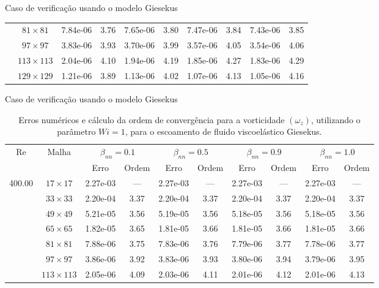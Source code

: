 \begin{frame}{Caso de verificação usando o modelo Giesekus}
\begin{table}[H]
{\begin{tabular*}{\textwidth}{@{\extracolsep\fill}cccccccccc@{}}
    & $81\times 81$ & 7.84e-06 & 3.76 & 7.65e-06 & 3.80 & 7.47e-06 & 3.84 & 7.43e-06 & 3.85 \\
    & $97\times 97$ & 3.83e-06 & 3.93 & 3.70e-06 & 3.99 & 3.57e-06 & 4.05 & 3.54e-06 & 4.06 \\
    & $113\times 113$ & 2.04e-06 & 4.10 & 1.94e-06 & 4.19 & 1.85e-06 & 4.27 & 1.83e-06 & 4.29 \\
    & $129\times 129$ & 1.21e-06 & 3.89 & 1.13e-06 & 4.02 & 1.07e-06 & 4.13 & 1.05e-06 & 4.16 \\
    \hline
    \end{tabular*}
}
\end{table}
\end{frame}

\begin{frame}{Caso de verificação usando o modelo Giesekus}
    \centering
    \begin{table}[H]
\caption{Erros numéricos e cálculo da ordem de convergência para a vorticidade $(\omega_{z})$, utilizando o parâmetro $Wi=1$, para o escoamento de fluido viscoelástico Giesekus.\label{tab_GiesekusWzResumida_2}}
\scriptsize{
    \begin{tabular*}{\textwidth}{@{\extracolsep\fill}cccccccccc@{}}
    \hline
    \multirow{2}{*}{$\operatorname{Re}$} & \multirow{2}{*}{Malha} & \multicolumn{2}{c}{$\beta_{nn}=0.1$}  & \multicolumn{2}{c}{$\beta_{nn}=0.5$}  & \multicolumn{2}{c}{$\beta_{nn}=0.9$}  & \multicolumn{2}{c}{$\beta_{nn}=1.0$}\\ %
     & & Erro & Ordem & Erro & Ordem & Erro & Ordem & Erro & Ordem \\
    \hline
    \multirow{7}{*}{400.00} & $17\times 17$ & 2.27e-03 & --- & 2.27e-03 & --- & 2.27e-03 & --- & 2.27e-03 & --- \\
    & $33\times 33$ & 2.20e-04 & 3.37 & 2.20e-04 & 3.37 & 2.20e-04 & 3.37 & 2.20e-04 & 3.37 \\
    & $49\times 49$ & 5.21e-05 & 3.56 & 5.19e-05 & 3.56 & 5.18e-05 & 3.56 & 5.18e-05 & 3.56 \\
    & $65\times 65$ & 1.82e-05 & 3.65 & 1.81e-05 & 3.66 & 1.81e-05 & 3.66 & 1.81e-05 & 3.66 \\
    & $81\times 81$ & 7.88e-06 & 3.75 & 7.83e-06 & 3.76 & 7.79e-06 & 3.77 & 7.78e-06 & 3.77 \\
    & $97\times 97$ & 3.86e-06 & 3.92 & 3.83e-06 & 3.93 & 3.80e-06 & 3.94 & 3.79e-06 & 3.95 \\
    & $113\times 113$ & 2.05e-06 & 4.09 & 2.03e-06 & 4.11 & 2.01e-06 & 4.12 & 2.01e-06 & 4.13 \\

\end{tabular*}}
\end{table}
\end{frame}

